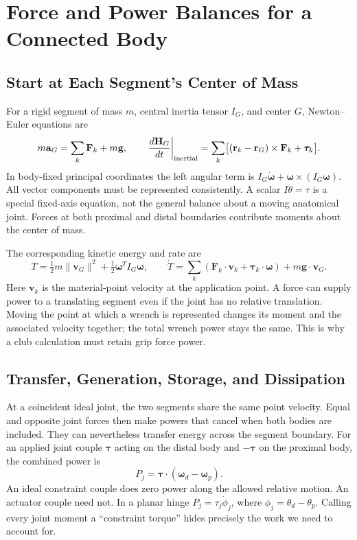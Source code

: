 \section{Force and Power Balances for a Connected Body}
\subsection{Start at Each Segment's Center of Mass}
For a rigid segment of mass $m$, central inertia tensor $I_G$, and center $G$, Newton--Euler equations are
\begin{equation}
m\mathbf a_G=\sum_k\mathbf F_k+m\mathbf g,\qquad
\left.\frac{d\mathbf H_G}{dt}\right|_{\rm inertial}=\sum_k\bigl[(\mathbf r_k-\mathbf r_G)\times\mathbf F_k+\boldsymbol\tau_k\bigr].
\end{equation}
In body-fixed principal coordinates the left angular term is $I_G\dot{\boldsymbol\omega}+\boldsymbol\omega\times(I_G\boldsymbol\omega)$. All vector components must be represented consistently. A scalar $I\ddot\theta=\tau$ is a special fixed-axis equation, not the general balance about a moving anatomical joint. Forces at both proximal and distal boundaries contribute moments about the center of mass.

The corresponding kinetic energy and rate are
\begin{equation}
T=\tfrac12m\|\mathbf v_G\|^2+\tfrac12\boldsymbol\omega^TI_G\boldsymbol\omega,\qquad
\dot T=\sum_k(\mathbf F_k\cdot\mathbf v_k+\boldsymbol\tau_k\cdot\boldsymbol\omega)+m\mathbf g\cdot\mathbf v_G.
\end{equation}
Here $\mathbf v_k$ is the material-point velocity at the application point. A force can supply power to a translating segment even if the joint has no relative translation. Moving the point at which a wrench is represented changes its moment and the associated velocity together; the total wrench power stays the same. This is why a club calculation must retain grip force power.

\subsection{Transfer, Generation, Storage, and Dissipation}
At a coincident ideal joint, the two segments share the same point velocity. Equal and opposite joint forces then make powers that cancel when both bodies are included. They can nevertheless transfer energy across the segment boundary. For an applied joint couple $\boldsymbol\tau$ acting on the distal body and $-\boldsymbol\tau$ on the proximal body, the combined power is
\begin{equation}
P_j=\boldsymbol\tau\cdot(\boldsymbol\omega_d-\boldsymbol\omega_p).
\end{equation}
An ideal constraint couple does zero power along the allowed relative motion. An actuator couple need not. In a planar hinge $P_j=\tau_j\dot\phi_j$, where $\phi_j=\theta_d-\theta_p$. Calling every joint moment a ``constraint torque'' hides precisely the work we need to account for.

